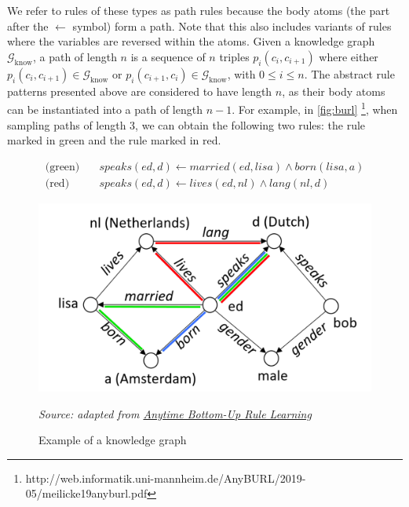 


We refer to rules of these types as path rules because the body atoms (the part after the \(\gets\) symbol) form a path. Note that this also includes variants of rules where the variables are reversed within the atoms. Given a knowledge graph \(\mathcal{G}_{\text{know}}\), a path of length \(n\) is a sequence of \(n\) triples \(p_i(c_i, c_{i+1})\) where either \(p_i(c_i, c_{i+1}) \in \mathcal{G}_{\text{know}}\) or \(p_i(c_{i+1}, c_i) \in \mathcal{G}_{\text{know}}\), with \(0 \leq i \leq n\). The abstract rule patterns presented above are considered to have length \(n\), as their body atoms can be instantiated into a path of length \(n - 1\). For example, in \autoref{fig:burl} \footnote{http://web.informatik.uni-mannheim.de/AnyBURL/2019-05/meilicke19anyburl.pdf},  
when sampling paths of length 3, we can obtain the following two rules: the rule marked in green and the rule marked in red.

\begin{equation*}
	\begin{aligned}
		\text{(green)} \quad & speaks(ed, d) \gets married(ed, lisa) \wedge born(lisa, a) \\
		\text{(red)} \quad & speaks(ed, d) \gets lives(ed, nl) \wedge lang(nl, d)
	\end{aligned}
\end{equation*}


\begin{figure}[h]
	\centering
	\includegraphics[width=12cm]{images/burl-ago.png}
	\caption{Example of a knowledge graph}
	\label{fig:burl}
	\textit{Source: adapted from \href{http://web.informatik.uni-mannheim.de/AnyBURL/2019-05/meilicke19anyburl.pdf}{Anytime Bottom-Up Rule Learning}}
\end{figure}

